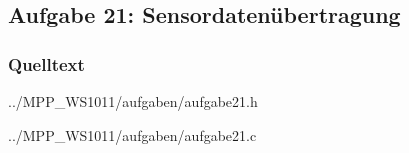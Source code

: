\subsection*{Aufgabe 21: Sensordatenübertragung}

\subsubsection*{Quelltext}

{../MPP_WS1011/aufgaben/aufgabe21.h}


{../MPP_WS1011/aufgaben/aufgabe21.c}
